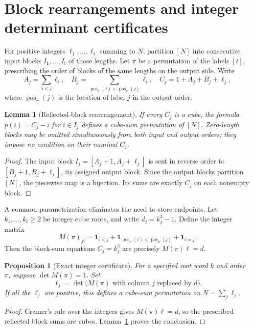 \documentclass[9pt]{extarticle}
\newtheorem{lemma}[theorem]{Lemma}
\newtheorem{proposition}[theorem]{Proposition}
\newcommand{\one}{\mathbf{1}}
\newcommand{\pp}{\operatorname{pos}}
\begin{document}
\section{Block rearrangements and integer determinant certificates}\label{sec:blocks}
For positive integers $\ell_1,\ldots,\ell_t$ summing to $N$, partition $[N]$ into consecutive input blocks $I_1,\ldots,I_t$ of those lengths. Let $\pi$ be a permutation of the labels $[t]$, prescribing the order of blocks of the same lengths on the output side. Write
\[
 A_j=\sum_{i<j}\ell_i,\quad B_j=\sum_{\pp_\pi(i)<\pp_\pi(j)}\ell_i,
 \quad C_j=1+A_j+B_j+\ell_j,
\]
where $\pp_\pi(j)$ is the location of label $j$ in the output order.
\begin{lemma}[Reflected-block rearrangement]\label{lem:blocks}
If every $C_j$ is a cube, the formula $p(i)=C_j-i$ for $i\in I_j$ defines a cube-sum permutation of $[N]$. Zero-length blocks may be omitted simultaneously from both input and output orders; they impose no condition on their nominal $C_j$.
\end{lemma}
\begin{proof}
The input block $I_j=[A_j+1,A_j+\ell_j]$ is sent in reverse order to $[B_j+1,B_j+\ell_j]$, its assigned output block. Since the output blocks partition $[N]$, the piecewise map is a bijection. Its sums are exactly $C_j$ on each nonempty block.
\end{proof}

A common parametrization eliminates the need to store endpoints. Let $k_1,\ldots,k_t\ge2$ be integer cube roots, and write $d_j=k_j^3-1$. Define the integer matrix
\begin{equation}\label{eq:matrix}
 M(\pi)_{ji}=\one_{i<j}+\one_{\pp_\pi(i)<\pp_\pi(j)}+\one_{i=j}.
\end{equation}
Then the block-sum equations $C_j=k_j^3$ are precisely $M(\pi)\ell=d$.
\begin{proposition}[Exact integer certificate]\label{prop:det}
For a specified root word $k$ and order $\pi$, suppose $\det M(\pi)=1$. Set
\begin{equation}\label{eq:cramer}
 \ell_j=\det\bigl(M(\pi)\text{ with column }j\text{ replaced by }d\bigr).
\end{equation}
If all the $\ell_j$ are positive, this defines a cube-sum permutation on $N=\sum_j\ell_j$.
\end{proposition}
\begin{proof}
Cramer's rule over the integers gives $M(\pi)\ell=d$, so the prescribed reflected block sums are cubes. Lemma~\ref{lem:blocks} proves the conclusion.
\end{proof}
\end{document}
